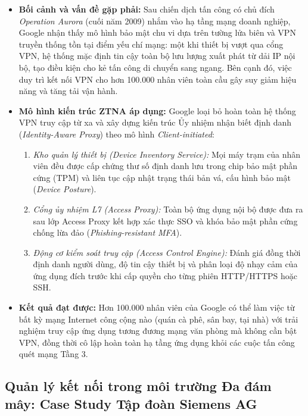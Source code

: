 \begin{itemize}
    \item \textbf{Bối cảnh và vấn đề gặp phải:} Sau chiến dịch tấn công có chủ đích \textit{Operation Aurora} (cuối năm 2009) nhắm vào hạ tầng mạng doanh nghiệp, Google nhận thấy mô hình bảo mật chu vi dựa trên tường lửa biên và VPN truyền thống tồn tại điểm yếu chí mạng: một khi thiết bị vượt qua cổng VPN, hệ thống mặc định tin cậy toàn bộ lưu lượng xuất phát từ dải IP nội bộ, tạo điều kiện cho kẻ tấn công di chuyển sang ngang. Bên cạnh đó, việc duy trì kết nối VPN cho hơn 100.000 nhân viên toàn cầu gây suy giảm hiệu năng và tăng tải vận hành.
    \item \textbf{Mô hình kiến trúc ZTNA áp dụng:} Google loại bỏ hoàn toàn hệ thống VPN truy cập từ xa và xây dựng kiến trúc Ủy nhiệm nhận biết định danh (\textit{Identity-Aware Proxy}) theo mô hình \textit{Client-initiated}:
    \begin{enumerate}
        \item \textit{Kho quản lý thiết bị (Device Inventory Service):} Mọi máy trạm của nhân viên đều được cấp chứng thư số định danh lưu trong chip bảo mật phần cứng (TPM) và liên tục cập nhật trạng thái bản vá, cấu hình bảo mật (\textit{Device Posture}).
        \item \textit{Cổng ủy nhiệm L7 (Access Proxy):} Toàn bộ ứng dụng nội bộ được đưa ra sau lớp Access Proxy kết hợp xác thực SSO và khóa bảo mật phần cứng chống lừa đảo (\textit{Phishing-resistant MFA}).
        \item \textit{Động cơ kiểm soát truy cập (Access Control Engine):} Đánh giá đồng thời định danh người dùng, độ tin cậy thiết bị và phân loại độ nhạy cảm của ứng dụng đích trước khi cấp quyền cho từng phiên HTTP/HTTPS hoặc SSH.
    \end{enumerate}
    \item \textbf{Kết quả đạt được:} Hơn 100.000 nhân viên của Google có thể làm việc từ bất kỳ mạng Internet công cộng nào (quán cà phê, sân bay, tại nhà) với trải nghiệm truy cập ứng dụng tương đương mạng văn phòng mà không cần bật VPN, đồng thời cô lập hoàn toàn hạ tầng ứng dụng khỏi các cuộc tấn công quét mạng Tầng 3.
\end{itemize}

\subsection{Quản lý kết nối trong môi trường Đa đám mây: Case Study Tập đoàn Siemens AG}
\label{subsec:5_1_2}

